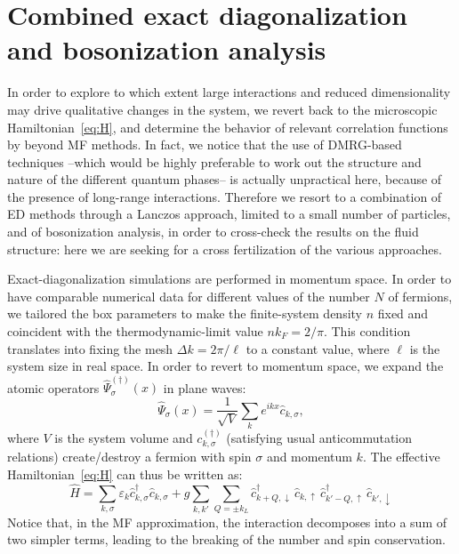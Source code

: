 \documentclass[pra,aps,superscriptaddress,twocolumn]{revtex4}
\begin{document}
\section{Combined exact diagonalization and bosonization analysis}\label{sec:ED}  %

In order to explore to which extent large interactions and reduced
dimensionality may drive qualitative changes in the system, we revert back to the microscopic
Hamiltonian~\eqref{eq:H}, and determine the behavior of relevant correlation functions by beyond MF methods.
In fact, we notice that the use of DMRG-based techniques --which would be highly preferable to work out the structure and nature
of the different quantum phases-- is actually unpractical here, because of the presence of long-range interactions.
Therefore we resort to a combination of ED methods through a Lanczos approach, limited to a small number of particles,
and of bosonization analysis, in order to cross-check the results on the fluid structure:
here we are seeking for a cross fertilization of the various approaches.

Exact-diagonalization simulations are performed in momentum space. In order to have comparable numerical data for different values of the number $N$ of fermions,
we tailored the box parameters to make the finite-system density $n$ fixed and coincident with the thermodynamic-limit value $nk_F=2/\pi$. This condition translates
into fixing the mesh $\Delta k= 2\pi/\ell$ to a constant value, where $\ell$ is the system size in real space.
In order to revert to momentum space, we expand
the atomic operators $\hat \Psi^{(\dagger)}_\sigma(x)$ in plane waves:
\begin{equation}
   \hat \Psi_\sigma(x) = \frac{1}{\sqrt{V}} \sum_k e^{i k x} \hat c_{k, \sigma} ,
\end{equation}
where $V$ is the system volume and $c^{(\dagger)}_{k, \sigma}$ (satisfying usual anticommutation relations)
create/destroy a fermion with spin $\sigma$ and momentum $k$.
The effective Hamiltonian~\eqref{eq:H} can thus be written as:
\begin{equation}
   \hat H = \sum_{k, \sigma}\varepsilon_k \hat c^\dagger_{k ,\sigma} \hat c_{k, \sigma} + g \sum_{k, k'} \sum_{Q = \pm k_L}
   \hat c^\dagger_{k+Q, \downarrow} \, \hat c_{k, \uparrow} \, \hat c^\dagger_{k'-Q,\uparrow} \, \hat c_{k', \downarrow}
   \label{eq:Ham_k}
\end{equation}
Notice that, in the MF approximation, the interaction decomposes into a sum of two simpler terms, leading to the breaking of the number
and spin conservation. %
\end{document}
